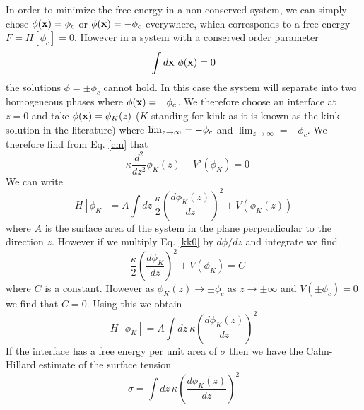 {\color{purple}In order to minimize the free energy in a non-conserved system, we can simply chose $\phi({\bf x}) =\phi_c$ or $\phi({\bf x}) =-\phi_c$ everywhere, which corresponds to a free energy $F=H[\phi_c]=0$.} However in a system with a conserved order parameter
\begin{equation}
    \int d{\bf x} \  \phi({\bf x})=0
\end{equation}
the solutions $\phi=\pm \phi_c$ cannot hold. In this case the system will separate into two {\color{purple}homogeneous} phases where $\phi({\bf x})= \pm \phi_c$. We therefore choose an interface at $z=0$ and take $\phi({\bf x}) = \phi_K(z)$ ($K$ standing for kink as it is known as the kink solution in the literature) where $\lim_{z\to\-\infty}=-\phi_c$ and  $\lim_{z\to\infty}=-\phi_c$. 
We therefore find from Eq. \eqref{cm} that
\begin{equation}
    -\kappa \frac{d^2 }{dz^2}\phi_K(z)  + V'(\phi_K) = 0 
    \label{kk0}
\end{equation}
We can write
\begin{equation}
    H[\phi_K]=  A\int dz \ \frac{\kappa}{2}\left(\frac{d\phi_K(z)}{dz}\right)^2 + V(\phi_K(z))
    \label{kk1}
\end{equation}
where $A$ is the surface area of the system in the plane perpendicular to the direction $z$. 
However if we multiply Eq. \eqref{kk0} by $d\phi/dz$ and integrate we find
\begin{equation}
    -\frac{\kappa}{2} (\frac{d\phi_K}{dz})^2 + V(\phi_K) = C
\end{equation}
where $C$ is a constant. However as $\phi_K(z)\to \pm \phi_c$ as $z\to \pm \infty$ and $V(\pm\phi_c) =0$ we find that $C=0$. Using this we obtain 
\begin{equation}
    H[\phi_K]=  A\int dz\  {\kappa}\left(\frac{d\phi_K(z)}{dz}\right)^2 
\end{equation}
If the interface has a free energy per unit area of $\sigma$ then we have the Cahn-Hillard estimate of the surface tension \cite{cahn_free_1958}
\begin{equation}
    \sigma=  \int dz\  {\kappa}\left(\frac{d\phi_K(z)}{dz}\right)^2 
    \label{CHST}
\end{equation}

